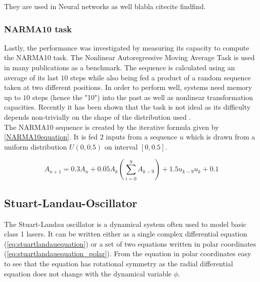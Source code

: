 They are used in Neural networks as well blabla citecite findfind. 
\cite{VOELKER Legendre Memory Units: Continuous-TimeRepresentation in Recurrent Neural Networks}





\subsubsection{NARMA10 task}
Lastly, the performance was investigated by measuring its capacity to compute the NARMA10 task. The Nonlinear Autoregressive Moving Average Task \cite{HER12} is used in many publications as a benchmark. The sequence is calculated using an average of its last $10$ steps while also being fed a product of a random sequence taken at two different positions. In order to perform well, systems need memory up to $10$ steps (hence the "10") into the past as well as nonlinear transformation capacities. Recently it has been shown that the task is not ideal as its difficulty depends non-trivially on the shape of the distribution used \cite{KUBOTA_Arxive}. \\
The NARMA10 sequence is created by the iterative formula given by \ref{NARMA10equation}. It is fed $2$ inputs from a sequence $u$ which is drawn from a uniform distribution $U(0,0.5)$ on interval $\left[0,0.5\right]$.

\begin{equation}
A_{n+1} = 0.3 A_{n} + 0.05 A_{k}\left( \sum_{i=0}^{9} A_{k-9} \right) +1.5 u_{k-9} u_{k} + 0.1
\label{NARMA10equation}
\end{equation}


	

\subsection{Stuart-Landau-Oscillator}
	The Stuart-Landau oscillator is a dynamical system often used to model basic class 1 lasers. It can be written either as a single complex differential equation (\ref{eq:stuartlandauequation}) or a set of two equations written in polar coordinates (\ref{eq:stuartlandauequation_polar}). From the equation in polar coordinates easy to see that the equation has rotational symmetry as the radial differential equation does not change with the dynamical variable $\phi$.

